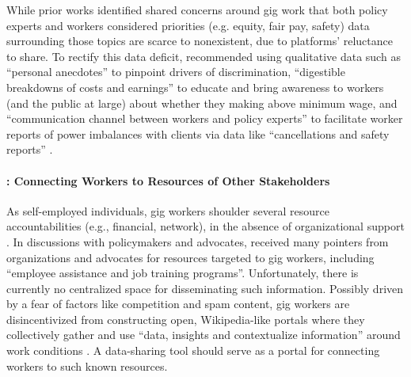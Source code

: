 \label{DR2.1}
{While prior works} \cite{supporting, codesign, zhang2023stakeholder} identified {shared}
 concerns {around gig work that both policy experts and workers considered priorities (e.g. equity, fair pay, safety) }data surrounding those topics are scarce to nonexistent, due to platforms' reluctance to share. 
 {To rectify this data deficit, \citet{supporting} recommended using qualitative data such as ``personal anecdotes'' to pinpoint drivers of discrimination, ``digestible breakdowns of costs and earnings'' to educate and bring awareness to workers (and the public at large) about whether they making above minimum wage, and ``communication channel between workers and policy experts'' to facilitate worker reports of power imbalances with clients via data like ``cancellations and safety reports'' \cite{uuapp}.}

\paragraph{: \textbf{Connecting Workers to Resources {of Other Stakeholders}}}
\label{DR2.2} 
{As self-employed individuals, gig workers shoulder several resource accountabilities (e.g., financial, network), in the absence of organizational support \cite{accountable}.}
In discussions with policymakers and advocates, \citet{codesign} received many pointers from organizations and advocates for resources targeted to gig workers{, including ``employee assistance and job training programs''}. Unfortunately, there is currently no centralized space for disseminating such information. 
{Possibly driven by a fear of factors like competition and spam content, gig workers are disincentivized from constructing open, Wikipedia-like portals where they collectively gather and use ``data, insights and contextualize information'' around work conditions \cite{uuapp}.}
{A d}ata-sharing tool should serve as {a portal for} connect{ing} workers to such {known} resources.

